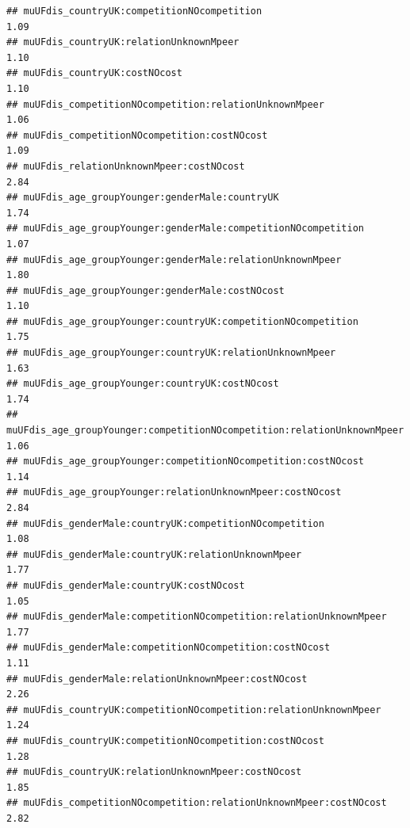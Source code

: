 \documentclass[
]{article}
\begin{document}
\begin{verbatim}
## muUFdis_countryUK:competitionNOcompetition                                                   1.09
## muUFdis_countryUK:relationUnknownMpeer                                                       1.10
## muUFdis_countryUK:costNOcost                                                                 1.10
## muUFdis_competitionNOcompetition:relationUnknownMpeer                                        1.06
## muUFdis_competitionNOcompetition:costNOcost                                                  1.09
## muUFdis_relationUnknownMpeer:costNOcost                                                      2.84
## muUFdis_age_groupYounger:genderMale:countryUK                                                1.74
## muUFdis_age_groupYounger:genderMale:competitionNOcompetition                                 1.07
## muUFdis_age_groupYounger:genderMale:relationUnknownMpeer                                     1.80
## muUFdis_age_groupYounger:genderMale:costNOcost                                               1.10
## muUFdis_age_groupYounger:countryUK:competitionNOcompetition                                  1.75
## muUFdis_age_groupYounger:countryUK:relationUnknownMpeer                                      1.63
## muUFdis_age_groupYounger:countryUK:costNOcost                                                1.74
## muUFdis_age_groupYounger:competitionNOcompetition:relationUnknownMpeer                       1.06
## muUFdis_age_groupYounger:competitionNOcompetition:costNOcost                                 1.14
## muUFdis_age_groupYounger:relationUnknownMpeer:costNOcost                                     2.84
## muUFdis_genderMale:countryUK:competitionNOcompetition                                        1.08
## muUFdis_genderMale:countryUK:relationUnknownMpeer                                            1.77
## muUFdis_genderMale:countryUK:costNOcost                                                      1.05
## muUFdis_genderMale:competitionNOcompetition:relationUnknownMpeer                             1.77
## muUFdis_genderMale:competitionNOcompetition:costNOcost                                       1.11
## muUFdis_genderMale:relationUnknownMpeer:costNOcost                                           2.26
## muUFdis_countryUK:competitionNOcompetition:relationUnknownMpeer                              1.24
## muUFdis_countryUK:competitionNOcompetition:costNOcost                                        1.28
## muUFdis_countryUK:relationUnknownMpeer:costNOcost                                            1.85
## muUFdis_competitionNOcompetition:relationUnknownMpeer:costNOcost                             2.82

\end{verbatim}
\end{document}
